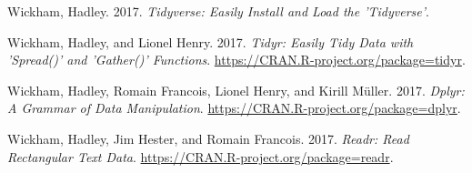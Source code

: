 \documentclass[12pt,]{krantz}
\theoremstyle{definition}
\theoremstyle{definition}
\theoremstyle{definition}
\theoremstyle{remark}
\begin{document}
\hypertarget{ref-R-tidyverse}{}
Wickham, Hadley. 2017. \emph{Tidyverse: Easily Install and Load the
'Tidyverse'}.

\hypertarget{ref-R-tidyr}{}
Wickham, Hadley, and Lionel Henry. 2017. \emph{Tidyr: Easily Tidy Data
with 'Spread()' and 'Gather()' Functions}.
\url{https://CRAN.R-project.org/package=tidyr}.

\hypertarget{ref-R-dplyr}{}
Wickham, Hadley, Romain Francois, Lionel Henry, and Kirill Müller. 2017.
\emph{Dplyr: A Grammar of Data Manipulation}.
\url{https://CRAN.R-project.org/package=dplyr}.

\hypertarget{ref-R-readr}{}
Wickham, Hadley, Jim Hester, and Romain Francois. 2017. \emph{Readr:
Read Rectangular Text Data}.
\url{https://CRAN.R-project.org/package=readr}.
\end{document}
